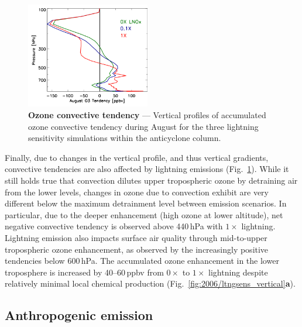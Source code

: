 	\begin{figure}
		\centering
		\vspace{-.3in}
		\begin{singlespacing}
		\includegraphics[width=0.48\textwidth]{sens/ltngsens_o3conv}
		\caption[- model correlation]{{\label{fig:2006/ltngsens_o3conv}
		\small\textbf{Ozone convective tendency} --- Vertical profiles of accumulated ozone convective
		tendency during August for the three lightning sensitivity simulations within the anticyclone column.
		\vspace{-.3in}}}
		\end{singlespacing}
	\end{figure}

Finally, due to changes in the vertical profile, and thus vertical gradients, convective tendencies are also affected by
lightning emissions (Fig.~\ref{fig:2006/ltngsens_o3conv}). While it still holds true that convection dilutes upper
tropospheric ozone by detraining air from the lower levels, changes in ozone due to convection exhibit are very different
below the maximum detrainment level between emission scenarios. In particular, due to the deeper enhancement (high
ozone at lower altitude), net negative convective tendency is observed above 440\,\unit{hPa} with $1\times$ lightning.
Lightning emission also impacts surface air quality through mid-to-upper tropospheric ozone enhancement, as observed
by the increasingly positive tendencies below 600\,\unit{hPa}. The accumulated ozone enhancement in the lower
troposphere is increased by 40--60\,\unit{ppbv} from $0\times$ to $1\times$ lightning despite relatively minimal local
chemical production (Fig.~\ref{fig:2006/ltngsens_vertical}{\bf a}).

\subsection{Anthropogenic emission}\label{ssec:2006/sens/anthrop}


